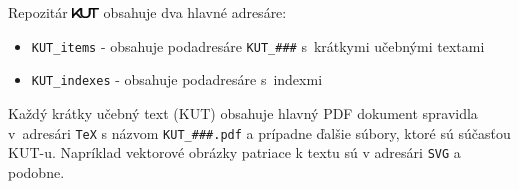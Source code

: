 \documentclass[a4paper, 11pt, ]{article}
\begin{document}
Repozitár \includegraphics[height=7.5pt]{./COMMONFILES/KUT_logo_v0.1.pdf} obsahuje dva hlavné adresáre:
\begin{itemize}[leftmargin=0pt, labelsep=3mm, itemsep=0pt]
    \item \verb|KUT_items| - obsahuje podadresáre \verb|KUT_###| s~krátkymi učebnými textami
    \item \verb|KUT_indexes| - obsahuje podadresáre s~indexmi   
\end{itemize}

Každý krátky učebný text (KUT) obsahuje hlavný PDF dokument spravidla v~adresári \verb|TeX| s názvom \verb|KUT_###.pdf| a prípadne ďalšie súbory, ktoré sú súčasťou KUT-u. Napríklad vektorové obrázky patriace k textu sú v adresári \verb|SVG| a podobne.






\end{document}

